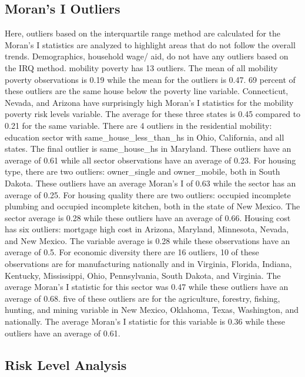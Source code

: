 \subsection{Moran's I Outliers}
Here, outliers based on the interquartile range method are calculated for the Moran's I statistics are analyzed to highlight areas that do not follow the overall trends. Demographics, household wage/ aid, do not have any outliers based on the IRQ method. mobility poverty has 13 outliers. The mean of all mobility poverty observations is 0.19 while the mean for the outliers is 0.47. 69 percent of these outliers are the same house below the poverty line variable. Connecticut, Nevada, and Arizona have surprisingly high Moran’s I statistics for the mobility poverty risk levels variable. The average for these three states is 0.45 compared to 0.21 for the same variable. There are 4 outliers in the residential mobility: education sector with same\_house\_less\_than\_hs in Ohio, California, and all states. The final outlier is same\_house\_hs in Maryland. These outliers have an average of 0.61 while all sector observations have an average of 0.23. For housing type, there are two outliers: owner\_single and owner\_mobile, both in South Dakota. These outliers have an average Moran’s I of 0.63 while the sector has an average of 0.25. For housing quality there are two outliers: occupied incomplete plumbing and occupied incomplete kitchen, both in the state of New Mexico. The sector average is 0.28 while these outliers have an average of 0.66. Housing cost has six outliers: mortgage high cost in Arizona, Maryland, Minnesota, Nevada, and New Mexico. The variable average is 0.28 while these observations have an average of 0.5. For economic diversity there are 16 outliers, 10 of these observations are for manufacturing nationally and in Virginia, Florida, Indiana, Kentucky, Mississippi, Ohio, Pennsylvania, South Dakota, and Virginia. The average Moran’s I statistic for this sector was 0.47 while these outliers have an average of 0.68. five of these outliers are for the agriculture, forestry, fishing, hunting, and mining variable in New Mexico, Oklahoma, Texas, Washington, and nationally. The average Moran’s I statistic for this variable is 0.36 while these outliers have an average of 0.61. 

\subsection{Risk Level Analysis}

